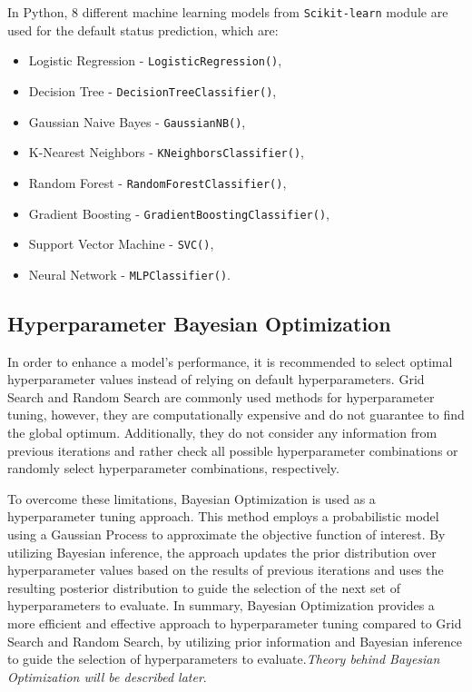 In Python, 8 different machine learning models from \lstinline{Scikit-learn} module are used for the default status prediction, which are:
\begin{itemize}\setlength\itemsep{0em}
    \item Logistic Regression - \lstinline{LogisticRegression()},
    \item Decision Tree - \lstinline{DecisionTreeClassifier()},
    \item Gaussian Naive Bayes - \lstinline{GaussianNB()},
    \item K-Nearest Neighbors - \lstinline{KNeighborsClassifier()},
    \item Random Forest - \lstinline{RandomForestClassifier()},
    \item Gradient Boosting - \lstinline{GradientBoostingClassifier()},
    \item Support Vector Machine - \lstinline{SVC()},
    \item Neural Network - \lstinline{MLPClassifier()}.
\end{itemize}

\subsection{Hyperparameter Bayesian Optimization}

In order to enhance a model's performance, it is recommended to select optimal hyperparameter values instead of relying on default hyperparameters.
Grid Search and Random Search are commonly used methods for hyperparameter tuning, however, they are computationally expensive and do not guarantee to find the global optimum.
Additionally, they do not consider any information from previous iterations and rather check all possible hyperparameter combinations or randomly select hyperparameter combinations, respectively.

To overcome these limitations, Bayesian Optimization is used as a hyperparameter tuning approach.
This method employs a probabilistic model using a Gaussian Process to approximate the objective function of interest.
By utilizing Bayesian inference, the approach updates the prior distribution over hyperparameter values based on the results of previous iterations and uses the resulting posterior distribution to guide the selection of the next set of hyperparameters to evaluate.
In summary, Bayesian Optimization provides a more efficient and effective approach to hyperparameter tuning compared to Grid Search and Random Search, by utilizing prior information and Bayesian inference to guide the selection of hyperparameters to evaluate.\textit{Theory behind Bayesian Optimization will be described later}.






